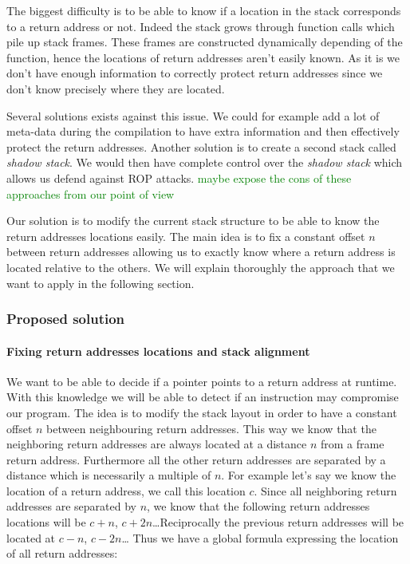 \documentclass[11pt]{sdm}
\begin{document}
The biggest difficulty is to be able to know if a location in the stack corresponds to a return address or not. Indeed the stack grows through function calls which pile up stack frames. 
These frames are constructed dynamically depending of the function, hence the locations of return addresses aren't easily known. As it is we don't have enough information to correctly protect return addresses since we don't know precisely where they are located.

Several solutions exists against this issue. We could for example add a lot of meta-data during the compilation to have extra information and then effectively protect the return addresses. Another solution is to create a second stack called \textit{shadow stack}. We would then have complete control over the \textit{shadow stack} which allows us defend against ROP attacks.
\textcolor{green}{maybe expose the cons of these approaches from our point of view}

Our solution is to modify the current stack structure to be able to know the return addresses locations easily. The main idea is to fix a constant offset $n$ between return addresses allowing us to exactly know where a return address is located relative to the others. We will explain thoroughly the approach that we want to apply in the following section.

\subsubsection{Proposed solution}
\label{ssub:Proposed solution}

\paragraph{Fixing return addresses locations and stack alignment}
\label{par:Fixing return addresses locations}

We want to be able to decide if a pointer points to a return address at runtime. With this knowledge we will be able to detect if an instruction may compromise our program.
The idea is to modify the stack layout in order to have a constant offset $n$ between neighbouring return addresses. This way we know that the neighboring return addresses are always located at a distance $n$ from a frame return address. Furthermore all the other return addresses are separated by a distance which is necessarily a multiple of $n$.
For example let's say we know the location of a return address, we call this location $c$.
Since all neighboring return addresses are separated by $n$, we know that the following return addresses locations will be $c+n$, $c+2n$\dots Reciprocally the previous return addresses will be located at $c-n$, $c-2n$\dots
Thus we have a global formula expressing the location of all return addresses: 
\end{document}
